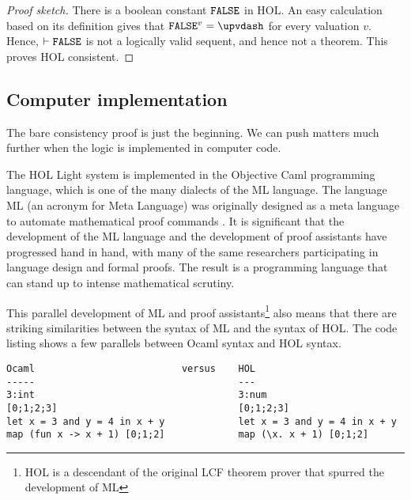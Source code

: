 \documentclass[brochure,english,12pt]{bourbaki}
\theoremstyle{plain}
\def\op#1{{\operatorname{#1}}}
\begin{document}
\begin{proof}[Proof sketch]
There is a boolean constant $\op{\tt FALSE}$ in HOL.
An easy calculation based on its definition gives that $\op{\tt FALSE}^v = \upvdash$ for every valuation $v$.
Hence, $\vdash \op{\tt FALSE}$ is not a logically valid sequent, and hence not a theorem.
This proves HOL consistent.
\end{proof}

\subsection{Computer implementation}

The bare consistency proof is just the beginning.  We can push matters  much further when
the logic is implemented in computer code.

The HOL Light system is implemented in the Objective Caml programming language, which is one of the many dialects of the ML
language.  The language ML (an acronym for Meta Language) was originally designed as a
meta language to automate mathematical proof commands \cite{Gor}.  It is significant that the development
of the ML language and the development of proof assistants have progressed hand in hand, with many
of the same researchers participating in language design and formal proofs.  
The result is a programming language that can stand up to intense mathematical scrutiny.

This parallel development of ML and proof assistants\footnote{HOL is a descendant of the original LCF theorem prover that
spurred the development of ML} also means that there are striking similarities between
the syntax of ML and the syntax of HOL.    The code listing shows a few parallels between Ocaml syntax and
HOL syntax.

\begin{lstlisting}[keepspaces=true,stringstyle=\tt,basicstyle=\small,frame=single,framesep=8pt,mathescape,morekeywords={type,let,and,in,Ocaml,HOL},columns=flexible]
Ocaml                          versus    HOL
-----                                    ---
3:int                                    3:num
[0;1;2;3]                                [0;1;2;3]  
let x = 3 and y = 4 in x + y             let x = 3 and y = 4 in x + y
map (fun x -> x + 1) [0;1;2]             map (\x. x + 1) [0;1;2]
\end{lstlisting}


\end{document}
